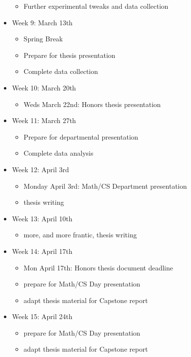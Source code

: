 \begin{itemize}
\begin{itemize}
  	\item Further experimental tweaks and data collection
  \end{itemize}
  \item Week 9: March 13th
  \begin{itemize}
    \item Spring Break
    \item Prepare for thesis presentation
    \item Complete data collection
  \end{itemize}
  \item Week 10: March 20th
  \begin{itemize}
    \item Weds March 22nd: Honors thesis presentation
  \end{itemize}
  \item Week 11: March 27th
  \begin{itemize}
  	\item Prepare for departmental presentation
    \item Complete data analysis
  \end{itemize}
  \item Week 12: April 3rd
  \begin{itemize}
    \item Monday April 3rd: Math/CS Department presentation
    \item thesis writing \Coffeecup \Coffeecup \Coffeecup
  \end{itemize}
  \item Week 13: April 10th
  \begin{itemize}
  	\item more, and more frantic, thesis writing \Coffeecup \Coffeecup \Coffeecup \Coffeecup \Coffeecup
  \end{itemize}
  \item Week 14: April 17th
  \begin{itemize}
    \item Mon April 17th: Honors thesis document deadline
    \item prepare for Math/CS Day presentation
    \item adapt thesis material for Capstone report
  \end{itemize}
  \item Week 15: April 24th
  \begin{itemize}
    \item prepare for Math/CS Day presentation
    \item adapt thesis material for Capstone report

\end{itemize}
\end{itemize}
